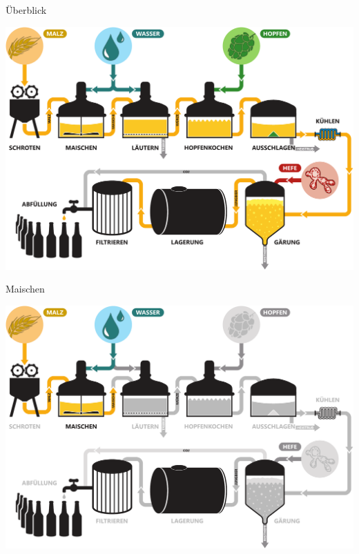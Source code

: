 \documentclass[9pt, ngerman]{beamer}
\begin{document}
\begin{frame}{Überblick}
  \begin{center}
    \vspace{0.5cm}
    \includegraphics[width=\textwidth]{pdfs/prozess-ueberblick.pdf}
  \end{center}
\end{frame}
\begin{frame}{Maischen}
  \begin{center}
    \vspace{0.5cm}
    \includegraphics[width=\textwidth]{pdfs/prozess-maischen.pdf}
  \end{center}
\end{frame}
\end{document}
